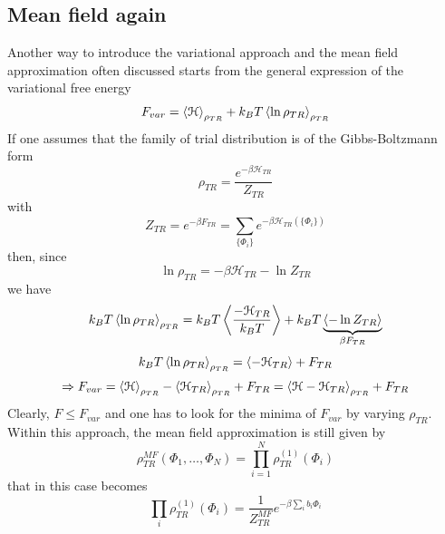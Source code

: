 \documentclass[../main/main.tex]{subfiles}
\begin{document}
\subsection{Mean field again}
Another way to introduce the variational approach and the mean field approximation often discussed starts from the general expression of the variational free energy
\begin{equation}
  F_{var} = \expval{\mathcal{H}}_{\rho _{TR}} + k_B T \expval{\ln{\rho _{TR}} }_{\rho _{TR}}
\end{equation}
If one assumes that the family of trial distribution is of the Gibbs-Boltzmann form
\begin{equation}
  \rho _{TR} = \frac{e^{- \beta \mathcal{H}_{TR}} }{Z_{TR}}
\end{equation}
with
\begin{equation}
  Z_{TR} = e^{-\beta F_{TR}} = \sum_{\{ \Phi _i \}  }^{} e^{-\beta \mathcal{H}_{TR} ( \{ \Phi _i \}  )}
\end{equation}
then, since
\begin{equation}
  \ln{\rho _{TR}} = - \beta \mathcal{H}_{TR} - \ln{Z_{TR}}
\end{equation}
we have
\begin{equation}
  k_B T \expval{\ln{\rho _{TR}} }_{\rho _{TR}} = k_B T \expval{\frac{- \mathcal{H}_{TR}}{k_B T}} + k_B T \underbrace{\expval{- \ln{Z_{TR}} } }_{\beta F_{TR}}
\end{equation}
\begin{equation}
  k_B T \expval{\ln{\rho _{TR}} }_{\rho _{TR}} = \expval{- \mathcal{H}_{TR}} + F_{TR}
\end{equation}
\begin{equation}
  \Rightarrow F_{var} = \expval{\mathcal{H}}_{\rho _{TR}} - \expval{\mathcal{H}_{TR}}_{\rho _{TR}}  + F_{TR}
  = \expval{\mathcal{H}- \mathcal{H}_{TR}}_{\rho _{TR}} + F_{TR}
\end{equation}
Clearly, \( F \le F_{var} \) and one has to look for the minima of \( F_{var} \) by varying \( \rho _{TR} \).
Within this approach, the  mean field approximation is still given by
\begin{equation}
  \rho _{TR}^{MF} (\Phi _1, \dots, \Phi _N) = \prod_{i=1}^{N} \rho _{TR}^{(1)} (\Phi _i)
\end{equation}
that in this case becomes
\begin{equation}
  \prod_{i}^{} \rho _{TR}^{(1)} (\Phi _i) = \frac{1}{Z_{TR}^{MF}} e^{-\beta \sum_{i}^{} b_i \Phi _i  }
\end{equation}
\end{document}
